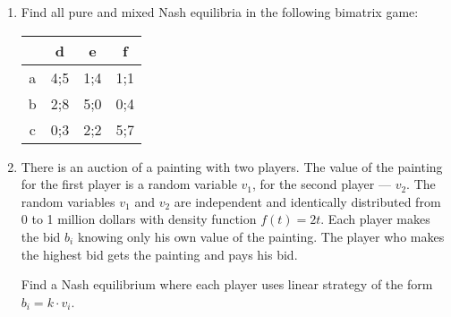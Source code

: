 \documentclass[12pt,a4paper]{article}
\begin{document}
\begin{enumerate}
\item Find all pure and mixed Nash equilibria in the following bimatrix game:


\begin{tabular}{c|ccc}
 & d & e & f \\ 
\hline 
a & 4;5 & 1;4 & 1;1  \\ 
b & 2;8 & 5;0 & 0;4  \\ 
c & 0;3 & 2;2 & 5;7  \\ 
\end{tabular} 


\item There is an auction of a painting with two players. The value of the painting for the first player is a random variable $v_1$, for the second player --- $v_2$. The random variables $v_1$ and $v_2$ are independent and identically distributed from 0 to 1 million dollars with density function $f(t)=2t$. Each player makes the bid $b_i$ knowing only his own value of the painting. The player who makes the highest bid gets the painting and pays his bid. 

Find a Nash equilibrium where each player uses linear strategy of the form $b_i=k\cdot v_i$.


\end{enumerate}
\end{document}
